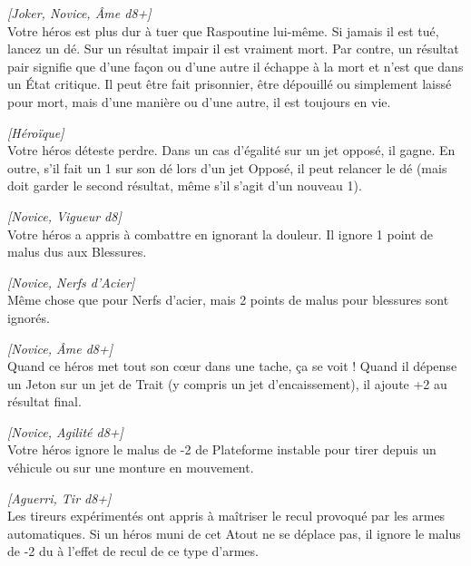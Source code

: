 \begin{description}[align=left]
    \item [Trompe-la-mort]
    	\emph{[Joker, Novice, Âme d8+]}\\
        Votre héros est plus dur à tuer que Raspoutine lui-même. Si jamais il est tué, lancez un dé. Sur un résultat impair il est vraiment mort. Par contre, un résultat pair signifie que d’une façon ou d’une autre il échappe à la mort et n’est que dans un \'Etat critique. Il peut être fait prisonnier, être dépouillé ou simplement laissé pour mort, mais d’une manière ou d’une autre, il est toujours en vie.

    \item [Instinct de tueur]
    	\emph{[Héroïque]}\\
        Votre héros déteste perdre. Dans un cas d’égalité sur un jet opposé, il gagne. En outre, s’il fait un 1 sur son dé lors d’un jet Opposé, il peut relancer le dé (mais doit garder le second résultat, même s’il s’agit d’un nouveau 1).

    \item [Nerfs d’acier]
        \emph{[Novice, Vigueur d8]}\\
        Votre héros a appris à combattre en ignorant la douleur. Il ignore 1 point de malus dus aux Blessures.

    \item [Nerfs d’acier trempés]
    	\emph{[Novice, Nerfs d’Acier]}\\
        Même chose que pour Nerfs d’acier, mais 2 points de malus pour blessures sont ignorés.

    \item [Panache]
    	\emph{[Novice, \^Ame d8+]}\\
        Quand ce héros met tout son c\oe{ur} dans une tache, ça se voit ! Quand il dépense un Jeton sur un jet de Trait (y compris un jet d’encaissement), il ajoute +2 au résultat final.

    \item [Poigne ferme]
    	\emph{[Novice, Agilité d8+]}\\
        Votre héros ignore le malus de -2 de Plateforme instable pour tirer depuis un véhicule ou sur une monture en mouvement.

    \item [Rock’n’rolla]
    	\emph{[Aguerri, Tir d8+]}\\
        Les tireurs expérimentés ont appris à maîtriser le recul provoqué par les armes automatiques. Si un héros muni de cet Atout ne se déplace pas, il ignore le malus de -2 du à l’effet de recul de ce type d’armes.


\end{description}
